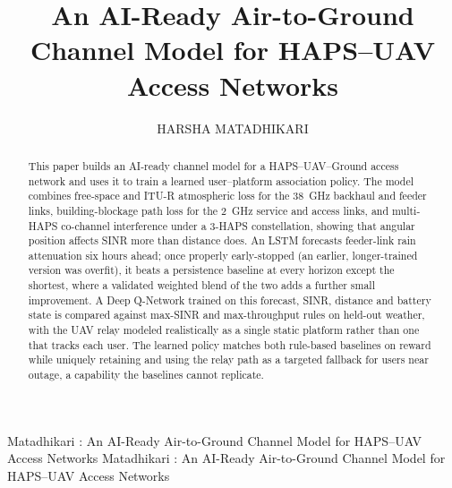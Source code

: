 \documentclass[]{ieeeaccess}
\begin{document}

\title{An AI-Ready Air-to-Ground Channel Model for HAPS--UAV Access Networks}

\author{\uppercase{Harsha Matadhikari}}

\address[1]{PG Diploma in Advanced Communication Engineering with Quantum AI Integration, Indian Institute of Technology Delhi, New Delhi, India (e-mail: harsha.matadhikari@gmail.com)}



\markboth
{Matadhikari \headeretal: An AI-Ready Air-to-Ground Channel Model for HAPS--UAV Access Networks}
{Matadhikari \headeretal: An AI-Ready Air-to-Ground Channel Model for HAPS--UAV Access Networks}



\begin{abstract}
This paper builds an AI-ready channel model for a HAPS--UAV--Ground access network and uses it to train a learned user--platform association policy. The model combines free-space and ITU-R atmospheric loss for the 38~GHz backhaul and feeder links, building-blockage path loss for the 2~GHz service and access links, and multi-HAPS co-channel interference under a 3-HAPS constellation, showing that angular position affects SINR more than distance does. An LSTM forecasts feeder-link rain attenuation six hours ahead; once properly early-stopped (an earlier, longer-trained version was overfit), it beats a persistence baseline at every horizon except the shortest, where a validated weighted blend of the two adds a further small improvement. A Deep Q-Network trained on this forecast, SINR, distance and battery state is compared against max-SINR and max-throughput rules on held-out weather, with the UAV relay modeled realistically as a single static platform rather than one that tracks each user. The learned policy matches both rule-based baselines on reward while uniquely retaining and using the relay path as a targeted fallback for users near outage, a capability the baselines cannot replicate.
\end{abstract}
\end{document}

